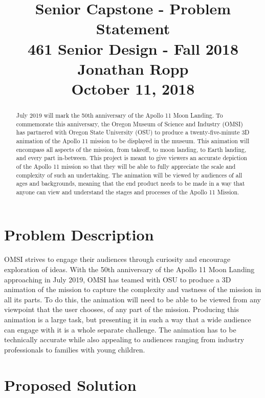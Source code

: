 \documentclass[onecolumn, draftclsnofoot,10pt, compsoc]{IEEEtran}
\begin{document}
\title{Senior Capstone - Problem Statement\\
	\large 461 Senior Design - Fall 2018\\
	\large Jonathan Ropp\\
	\large October 11, 2018}

\maketitle

\begin{abstract}
July 2019 will mark the 50th anniversary of the Apollo 11 Moon Landing. To commemorate this anniversary, the Oregon Museum of Science and Industry (OMSI) has partnered with Oregon State University (OSU) to produce a twenty-five-minute 3D animation of the Apollo 11 mission to be displayed in the museum. This animation will encompass all aspects of the mission, from takeoff, to moon landing, to Earth landing, and every part in-between. This project is meant to give viewers an accurate depiction of the Apollo 11 mission so that they will be able to fully appreciate the scale and complexity of such an undertaking. The animation will be viewed by audiences of all ages and backgrounds, meaning that the end product needs to be made in a way that anyone can view and understand the stages and processes of the Apollo 11 Mission.
\end{abstract}

\section{Problem Description}

OMSI strives to engage their audiences through curiosity and encourage exploration of ideas. With the 50th anniversary of the Apollo 11 Moon Landing approaching in July 2019, OMSI has teamed with OSU to produce a 3D animation of the mission to capture the complexity and vastness of the mission in all its parts. To do this, the animation will need to be able to be viewed from any viewpoint that the user chooses, of any part of the mission. Producing this animation is a large task, but presenting it in such a way that a wide audience can engage with it is a whole separate challenge. The animation has to be technically accurate while also appealing to audiences ranging from industry professionals to families with young children. 

\section{Proposed Solution}
\end{document}
